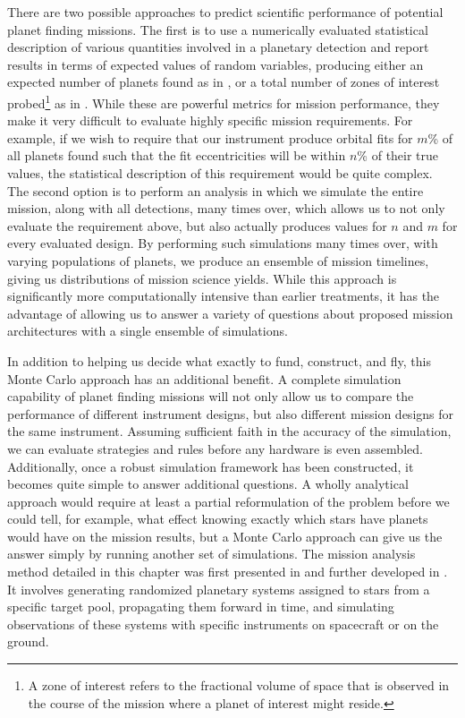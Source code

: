 There are two possible approaches to predict scientific performance of potential planet finding missions.  The first is to use a numerically evaluated statistical description of various quantities involved in a planetary detection and report results in terms of expected values  of random variables, producing either an expected number of planets found as in \citet{brown2005}, or a total number of zones of interest probed\footnote{A zone of interest refers to the fractional volume of space that is observed in the course of the mission where a planet of interest might reside.} as in \citet{lindler2007}.  While these are powerful metrics for mission performance, they make it very difficult to evaluate highly specific mission requirements.  For example, if we wish to require that our instrument produce orbital fits for $m$\% of all planets found such that the fit eccentricities will be within $n$\% of their true values, the statistical description of this requirement would be quite complex.  The second option is to perform an analysis in which we simulate the entire mission, along with all detections, many times over, which allows us to not only evaluate the requirement above, but also actually produces values for $n$ and $m$ for every evaluated design.  By performing such simulations many times over, with varying populations of planets, we produce an ensemble of mission timelines, giving us distributions of mission science yields. While this approach is significantly more computationally intensive than earlier treatments, it has the advantage of allowing us to answer a variety of questions about proposed mission architectures with a single ensemble of simulations.

In addition to helping us decide what exactly to fund, construct, and fly, this Monte Carlo approach has an additional benefit.  A complete simulation capability of planet finding missions will not only allow us to compare the performance of different instrument designs, but also different mission designs for the same instrument.  Assuming sufficient faith in the accuracy of the simulation, we can evaluate strategies and rules before any hardware is even assembled. Additionally, once a robust simulation framework has been constructed, it becomes quite simple to answer additional questions.  A wholly analytical approach would require at least a partial reformulation of the problem before we could tell, for example, what effect knowing exactly which stars have planets would have on the mission results, but a Monte Carlo approach can give us the answer simply by running another set of simulations.  The mission analysis method detailed in this chapter was first presented in \citet{savransky2008} and further developed in \citet{savransky2010}.  It involves generating randomized planetary systems assigned to stars from a specific target pool, propagating them forward in time, and simulating observations of these systems with specific instruments on spacecraft or on the ground.

